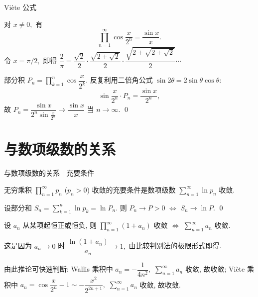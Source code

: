 \begin{frame}{Viète 公式}

\begin{thm}[Viète 公式, 1593]
对 $x \neq 0,$ 有
\[
\prod_{n=1}^\infty \cos \frac{x}{2^{n}} = \frac{\sin x}{x}.
\]
令 $x = \pi/2,$ 即得 $\dfrac{2}{\pi} = \dfrac{\sqrt{2}}{2} \cdot \dfrac{\sqrt{2+\sqrt{2}}}{2} \cdot \dfrac{\sqrt{2+\sqrt{2+\sqrt{2}}}}{2} \cdots$
\end{thm}

\startproof[bg=yellow, fg=red]
部分积 $P_n = \prod\limits_{k=1}^n \cos \dfrac{x}{2^k}.$ 反复利用二倍角公式 $\sin 2\theta = 2\sin\theta\cos\theta:$
\[
\sin\frac{x}{2^n} \cdot P_n = \frac{\sin x}{2^n},
\]
故 $P_n = \dfrac{\sin x}{2^n \sin\frac{x}{2^n}} \to \dfrac{\sin x}{x}$ 当 $n \to \infty.$
\qed

\end{frame}


\section[与级数的关系]{与数项级数的关系}


\begin{frame}{与数项级数的关系 | {\smaller[2] 充要条件}}

\begin{thm}
无穷乘积 $\prod\limits_{n=1}^\infty p_n$ ($p_n > 0$) 收敛的充要条件是数项级数 $\sum\limits_{n=1}^\infty \ln p_n$ 收敛.
\end{thm}

\startproof[bg=yellow, fg=red]
设部分和 $S_n = \sum\limits_{k=1}^n \ln p_k = \ln P_n.$ 则 $P_n \to P > 0$ $\Longleftrightarrow$ $S_n \to \ln P.$
\qed

\pause
\vspace{0.5em}

\begin{cor}
设 $a_n$ 从某项起恒正或恒负, 则 $\prod\limits_{n=1}^\infty (1 + a_n)$ 收敛 $\Longleftrightarrow$ $\sum\limits_{n=1}^\infty a_n$ 收敛.
\end{cor}

这是因为 $a_n \to 0$ 时 $\dfrac{\ln(1 + a_n)}{a_n} \to 1,$ 由比较判别法的极限形式即得.

\pause
\vspace{0.5em}

由此推论可快速判断: Wallis 乘积中 $a_n = -\dfrac{1}{4n^2},$ $\sum\limits_{n=1}^\infty a_n$ 收敛, 故收敛; Viète 乘积中 $a_n = \cos\dfrac{x}{2^n} - 1 \sim -\dfrac{x^2}{2^{2n+1}},$ $\sum\limits_{n=1}^\infty a_n$ 收敛, 故收敛.

\end{frame}

